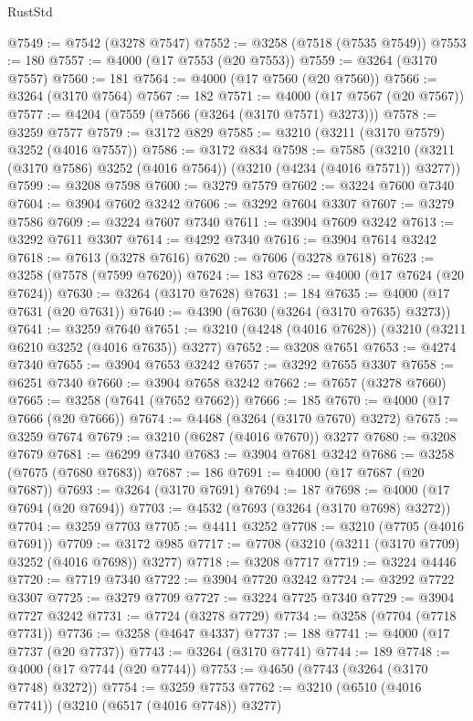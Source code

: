 \begin{lexlean}{RustStd}
\begin{coremodule}
@7549 := @7542 (@3278 @7547)
@7552 := @3258 (@7518 (@7535 @7549))
@7553 := 180
@7557 := @4000 (@17 @7553 (@20 @7553))
@7559 := @3264 (@3170 @7557)
@7560 := 181
@7564 := @4000 (@17 @7560 (@20 @7560))
@7566 := @3264 (@3170 @7564)
@7567 := 182
@7571 := @4000 (@17 @7567 (@20 @7567))
@7577 := @4204 (@7559 (@7566 (@3264 (@3170 @7571) @3273)))
@7578 := @3259 @7577
@7579 := @3172 @829
@7585 := @3210 (@3211 (@3170 @7579) @3252 (@4016 @7557))
@7586 := @3172 @834
@7598 := @7585 (@3210 (@3211 (@3170 @7586) @3252 (@4016 @7564)) (@3210 (@4234 (@4016 @7571)) @3277))
@7599 := @3208 @7598
@7600 := @3279 @7579
@7602 := @3224 @7600 @7340
@7604 := @3904 @7602 @3242
@7606 := @3292 @7604 @3307
@7607 := @3279 @7586
@7609 := @3224 @7607 @7340
@7611 := @3904 @7609 @3242
@7613 := @3292 @7611 @3307
@7614 := @4292 @7340
@7616 := @3904 @7614 @3242
@7618 := @7613 (@3278 @7616)
@7620 := @7606 (@3278 @7618)
@7623 := @3258 (@7578 (@7599 @7620))
@7624 := 183
@7628 := @4000 (@17 @7624 (@20 @7624))
@7630 := @3264 (@3170 @7628)
@7631 := 184
@7635 := @4000 (@17 @7631 (@20 @7631))
@7640 := @4390 (@7630 (@3264 (@3170 @7635) @3273))
@7641 := @3259 @7640
@7651 := @3210 (@4248 (@4016 @7628)) (@3210 (@3211 @6210 @3252 (@4016 @7635)) @3277)
@7652 := @3208 @7651
@7653 := @4274 @7340
@7655 := @3904 @7653 @3242
@7657 := @3292 @7655 @3307
@7658 := @6251 @7340
@7660 := @3904 @7658 @3242
@7662 := @7657 (@3278 @7660)
@7665 := @3258 (@7641 (@7652 @7662))
@7666 := 185
@7670 := @4000 (@17 @7666 (@20 @7666))
@7674 := @4468 (@3264 (@3170 @7670) @3272)
@7675 := @3259 @7674
@7679 := @3210 (@6287 (@4016 @7670)) @3277
@7680 := @3208 @7679
@7681 := @6299 @7340
@7683 := @3904 @7681 @3242
@7686 := @3258 (@7675 (@7680 @7683))
@7687 := 186
@7691 := @4000 (@17 @7687 (@20 @7687))
@7693 := @3264 (@3170 @7691)
@7694 := 187
@7698 := @4000 (@17 @7694 (@20 @7694))
@7703 := @4532 (@7693 (@3264 (@3170 @7698) @3272))
@7704 := @3259 @7703
@7705 := @4411 @3252
@7708 := @3210 (@7705 (@4016 @7691))
@7709 := @3172 @985
@7717 := @7708 (@3210 (@3211 (@3170 @7709) @3252 (@4016 @7698)) @3277)
@7718 := @3208 @7717
@7719 := @3224 @4446
@7720 := @7719 @7340
@7722 := @3904 @7720 @3242
@7724 := @3292 @7722 @3307
@7725 := @3279 @7709
@7727 := @3224 @7725 @7340
@7729 := @3904 @7727 @3242
@7731 := @7724 (@3278 @7729)
@7734 := @3258 (@7704 (@7718 @7731))
@7736 := @3258 (@4647 @4337)
@7737 := 188
@7741 := @4000 (@17 @7737 (@20 @7737))
@7743 := @3264 (@3170 @7741)
@7744 := 189
@7748 := @4000 (@17 @7744 (@20 @7744))
@7753 := @4650 (@7743 (@3264 (@3170 @7748) @3272))
@7754 := @3259 @7753
@7762 := @3210 (@6510 (@4016 @7741)) (@3210 (@6517 (@4016 @7748)) @3277)

\end{coremodule}
\end{lexlean}
